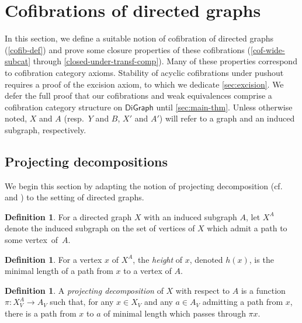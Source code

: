 \documentclass[11pt]{article}
\theoremstyle{definition}
\newtheorem{defi}[theo]{Definition}
\numberwithin{equation}{section}
\newcommand{\DiGraph}{\mathsf{DiGraph}}
\begin{document}
\section{Cofibrations of directed graphs} \label{sec:cofibs}

In this section, we define a suitable notion of cofibration of directed graphs (\cref{cofib-def}) and prove some closure properties of these cofibrations (\cref{cof-wide-subcat} through \cref{closed-under-transf-comp}). 
Many of these properties correspond to cofibration category axioms.
Stability of acyclic cofibrations under pushout requires a proof of the excision axiom, to which we dedicate \cref{sec:excision}.
We defer the full proof that our cofibrations and weak equivalences comprise a cofibration category structure on $\DiGraph$ until \cref{sec:main-thm}. 
Unless otherwise noted, $X$ and $A$ (resp.~$Y$ and $B$, $X'$ and $A'$) will refer to a graph and an induced subgraph, respectively.

\subsection{Projecting decompositions}

We begin this section by adapting the notion of projecting decomposition (cf.~\cite[Def.~4.6]{leinster:magnitude-graph} and \cite[Def.~26]{hepworth-willerton}) to the setting of directed graphs.

\begin{defi}
For a directed graph $X$ with an induced subgraph $A$, let $X^A$ denote the induced subgraph on the set of vertices of $X$ which admit a path to some vertex~of~$A$.     
\end{defi}

\begin{defi}
For a vertex $x$ of $X^A$, the \emph{height} of $x$, denoted $h(x)$, is the minimal length of a path from $x$ to a vertex of $A$.
\end{defi}

\begin{defi}\label{proj-decomp-def}
A \emph{projecting decomposition} of $X$ with respect to $A$ is a function $\pi \colon X_{V}^A \to A_V$ such that, for any $x \in X_V$ and any $a \in A_V$ admitting a path from $x$, there is a path from $x$ to $a$ of minimal length which passes through $\pi x$.
\end{defi}
\end{document}
